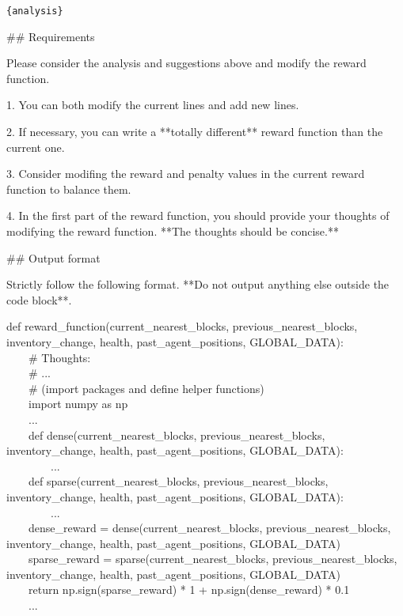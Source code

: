 \textasciigrave \textasciigrave \textasciigrave 

\texttt{\{analysis\}}

\textasciigrave \textasciigrave \textasciigrave 



\#\# Requirements

Please consider the analysis and suggestions above and modify the reward function.

1. You can both modify the current lines and add new lines.

2. If necessary, you can write a **totally different** reward function than the current one.

3. Consider modifing the reward and penalty values in the current reward function to balance them.

4. In the first part of the reward function, you should provide your thoughts of modifying the reward function. **The thoughts should be concise.**



\#\# Output format

Strictly follow the following format. **Do not output anything else outside the code block**.





def reward\_function(current\_nearest\_blocks, previous\_nearest\_blocks, inventory\_change, health, past\_agent\_positions, GLOBAL\_DATA):
\\
\hbox{\ \ \ \ }\# Thoughts:\\
\hbox{\ \ \ \ }\# ...\\
\hbox{\ \ \ \ }\# (import packages and define helper functions)\\
\hbox{\ \ \ \ }import numpy as np\\
\hbox{\ \ \ \ }...\\
\hbox{\ \ \ \ }def dense(current\_nearest\_blocks, previous\_nearest\_blocks, inventory\_change, health, past\_agent\_positions, GLOBAL\_DATA):\\
\hbox{\ \ \ \ \ \ \ \ }...\\
\hbox{\ \ \ \ }def sparse(current\_nearest\_blocks, previous\_nearest\_blocks, inventory\_change, health, past\_agent\_positions, GLOBAL\_DATA):\\
\hbox{\ \ \ \ \ \ \ \ }...\\
\hbox{\ \ \ \ }dense\_reward = dense(current\_nearest\_blocks, previous\_nearest\_blocks, inventory\_change, health, past\_agent\_positions, GLOBAL\_DATA)\\
\hbox{\ \ \ \ }sparse\_reward = sparse(current\_nearest\_blocks, previous\_nearest\_blocks, inventory\_change, health, past\_agent\_positions, GLOBAL\_DATA)\\
\hbox{\ \ \ \ }return np.sign(sparse\_reward) * 1 + np.sign(dense\_reward) * 0.1\\
\hbox{\ \ \ \ }...\\
